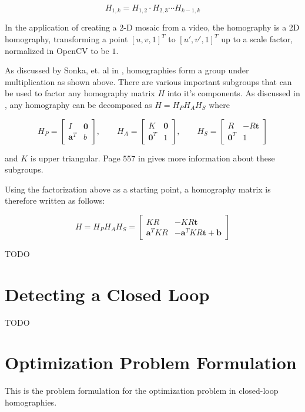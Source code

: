 \documentclass{article}
\begin{document}
\[H_{1, k} = H_{1, 2} \cdot H_{2, 3} \cdots H_{k - 1, k}\]

In the application of creating a 2-D mosaic from a video, the homography is a
2D homography, transforming a point $[u, v, 1]^T$ to $[u', v', 1]^T$ up to a
scale factor, normalized in OpenCV to be $1$. 

As discussed by Sonka, et. al in \cite{sonkatext}, homographies form a group
under multiplication as shown above. There are various important subgroups that
can be used to factor any homography matrix $H$ into it's components. As
discussed in \cite{sonkatext}, any homography can be decomposed as $H = H_P H_A H_S$ where 

\[
H_P = \begin{bmatrix} I & \mathbf{0} \\ \mathbf{a}^T & b \end{bmatrix}, \qquad
H_A = \begin{bmatrix} K & \mathbf{0} \\ \mathbf{0}^T & 1 \end{bmatrix}, \qquad
H_S = \begin{bmatrix} R & -R\mathbf{t} \\ \mathbf{0}^T & 1 \end{bmatrix}
\] 

and $K$ is upper triangular. Page $557$ in \cite{sonkatext} gives more
information about these subgroups. 

Using the factorization above as a starting point, a homography matrix is
therefore written as follows:

\[H = H_P H_A H_S = \begin{bmatrix}KR & -KR\mathbf{t} \\ \mathbf{a}^TKR &
 -\mathbf{a}^TKR\mathbf{t} + \mathbf{b} \end{bmatrix}\] 



TODO 

\section{Detecting a Closed Loop}

TODO

\section{Optimization Problem Formulation}

This is the problem formulation for the optimization problem in closed-loop
homographies.
\end{document}
